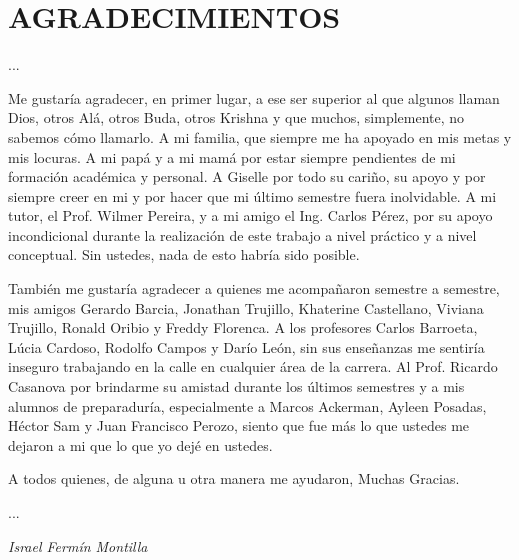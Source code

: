 \chapter*{AGRADECIMIENTOS}

...

Me gustaría agradecer, en primer lugar, a ese ser superior al que algunos llaman Dios, otros Alá, otros Buda, otros Krishna y que muchos, simplemente, no sabemos cómo llamarlo. A mi familia, que siempre me ha apoyado en mis metas y mis locuras. A mi papá y a mi mamá por estar siempre pendientes de mi formación académica y personal. A Giselle por todo su cariño, su apoyo y por siempre creer en mi y por hacer que mi último semestre fuera inolvidable. A mi tutor, el Prof. Wilmer Pereira, y a mi amigo el Ing. Carlos Pérez, por su apoyo incondicional durante la realización de este trabajo a nivel práctico y a nivel conceptual. Sin ustedes, nada de esto habría sido posible.

También me gustaría agradecer a quienes me acompañaron semestre a semestre, mis amigos Gerardo Barcia, Jonathan Trujillo, Khaterine Castellano, Viviana Trujillo, Ronald Oribio y Freddy Florenca. A los profesores Carlos Barroeta, Lúcia Cardoso, Rodolfo Campos y Darío León, sin sus enseñanzas me sentiría inseguro trabajando en la calle en cualquier área de la carrera. Al Prof. Ricardo Casanova por brindarme su amistad durante los últimos semestres y a mis alumnos de preparaduría, especialmente a Marcos Ackerman, Ayleen Posadas, Héctor Sam y Juan Francisco Perozo, siento que fue más lo que ustedes me dejaron a mi que lo que yo dejé en ustedes.

A todos quienes, de alguna u otra manera me ayudaron,
Muchas Gracias.

...

\begin{flushright}
\textit{Israel Fermín Montilla}
\end{flushright}
